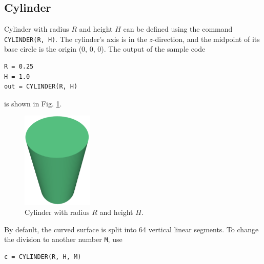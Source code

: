 \subsection{Cylinder}

Cylinder with radius $R$ and height $H$ can be defined using 
the command {\tt CYLINDER(R, H)}. The cylinder's axis is in 
the $z$-direction, and the midpoint of its base circle is the 
origin (0, 0, 0). The output of the sample code\\

\begin{bbox}
\begin{verbatim}
R = 0.25
H = 1.0
out = CYLINDER(R, H)
\end{verbatim}
\end{bbox}
\vspace{6mm}

\noindent
is shown in Fig. \ref{fig:cyl-1}.

\begin{figure}[!ht]
\begin{center}
\includegraphics[width=0.3\textwidth]{img/cyl-1.png}
\end{center}
\vspace{-4mm}
\caption{Cylinder with radius $R$ and height $H$.}
\label{fig:cyl-1}
\end{figure}
\noindent
By default, the curved surface is split into 64 vertical linear segments. To 
change the division to another number {\tt M}, use\\

\begin{bbox}
\begin{verbatim}
c = CYLINDER(R, H, M)
\end{verbatim}
\end{bbox}
\vspace{6mm}

\noindent

